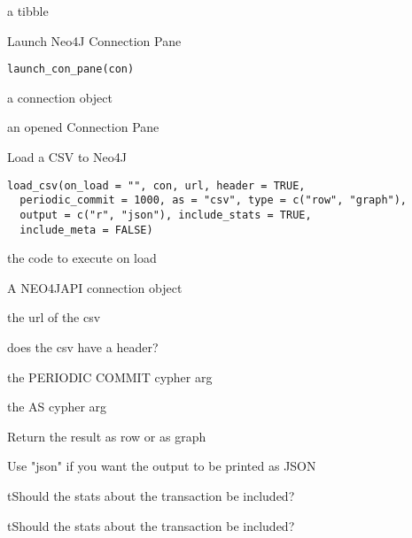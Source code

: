 \documentclass[a4paper]{book}
\begin{document}
%
\begin{Value}
a tibble
\end{Value}
%
\begin{Description}\relax
Launch Neo4J Connection Pane
\end{Description}
%
\begin{Usage}
\begin{verbatim}
launch_con_pane(con)
\end{verbatim}
\end{Usage}
%
\begin{Arguments}
\begin{ldescription}
\item[\code{con}] a connection object
\end{ldescription}
\end{Arguments}
%
\begin{Value}
an opened Connection Pane
\end{Value}
%
\begin{Description}\relax
Load a CSV to Neo4J
\end{Description}
%
\begin{Usage}
\begin{verbatim}
load_csv(on_load = "", con, url, header = TRUE,
  periodic_commit = 1000, as = "csv", type = c("row", "graph"),
  output = c("r", "json"), include_stats = TRUE,
  include_meta = FALSE)
\end{verbatim}
\end{Usage}
%
\begin{Arguments}
\begin{ldescription}
\item[\code{on\_load}] the code to execute on load

\item[\code{con}] A NEO4JAPI connection object

\item[\code{url}] the url of the csv

\item[\code{header}] does the csv have a header?

\item[\code{periodic\_commit}] the PERIODIC COMMIT cypher arg

\item[\code{as}] the AS cypher arg

\item[\code{type}] Return the result as row or as graph

\item[\code{output}] Use "json" if you want the output to be printed as JSON

\item[\code{include\_stats}] tShould the stats about the transaction be included?

\item[\code{include\_meta}] tShould the stats about the transaction be included?
\end{ldescription}
\end{Arguments}
\end{document}
